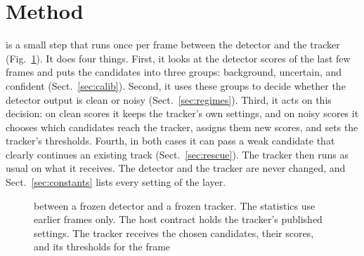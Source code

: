 \section{Method}\label{sec:method}

\scl{} is a small step that runs once per frame between the detector and the
tracker (Fig.~\ref{fig:arch}). It does four things. First, it looks at the
detector scores of the last few frames and puts the candidates into three
groups: background, uncertain, and confident (Sect.~\ref{sec:calib}).
Second, it uses these groups to decide whether the detector output is clean
or noisy (Sect.~\ref{sec:regimes}). Third, it acts on this decision: on
clean scores it keeps the tracker's own settings, and on noisy scores it
chooses which candidates reach the tracker, assigns them new scores, and sets
the tracker's thresholds. Fourth, in both cases it can pass a weak candidate
that clearly continues an existing track (Sect.~\ref{sec:rescue}). The
tracker then runs as usual on what it receives. The detector and the tracker
are never changed, and Sect.~\ref{sec:constants} lists every setting of the
layer.

\begin{figure}[t]
\centering
{}
\caption{\scl{} between a frozen detector
and a frozen tracker. The statistics use earlier frames only. The host
contract holds the tracker's published settings. The tracker receives the
chosen candidates, their scores, and its thresholds for the frame}
\label{fig:arch}
\end{figure}

